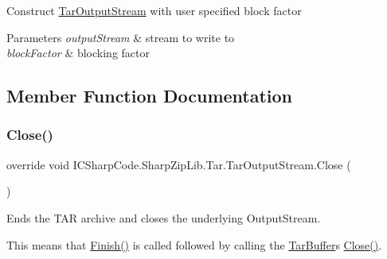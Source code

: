 Construct \hyperlink{class_i_c_sharp_code_1_1_sharp_zip_lib_1_1_tar_1_1_tar_output_stream}{Tar\+Output\+Stream} with user specified block factor 


\begin{DoxyParams}{Parameters}
{\em output\+Stream} & stream to write to\\
\hline
{\em block\+Factor} & blocking factor\\
\hline
\end{DoxyParams}


\subsection{Member Function Documentation}
\mbox{\label{class_i_c_sharp_code_1_1_sharp_zip_lib_1_1_tar_1_1_tar_output_stream_ab744534cafac308f51f6586f06ca3d86}} 
\subsubsection{\texorpdfstring{Close()}{Close()}}
{\footnotesize\ttfamily override void I\+C\+Sharp\+Code.\+Sharp\+Zip\+Lib.\+Tar.\+Tar\+Output\+Stream.\+Close (\begin{DoxyParamCaption}{ }\end{DoxyParamCaption})\hspace{0.3cm}{\ttfamily [inline]}}



Ends the T\+AR archive and closes the underlying Output\+Stream. 

This means that \hyperlink{class_i_c_sharp_code_1_1_sharp_zip_lib_1_1_tar_1_1_tar_output_stream_a35766aed4ddf363bbaca72d33b0e071d}{Finish()} is called followed by calling the \hyperlink{class_i_c_sharp_code_1_1_sharp_zip_lib_1_1_tar_1_1_tar_buffer}{Tar\+Buffer}\textquotesingle{}s \hyperlink{class_i_c_sharp_code_1_1_sharp_zip_lib_1_1_tar_1_1_tar_output_stream_ab744534cafac308f51f6586f06ca3d86}{Close()}.\mbox{\label{class_i_c_sharp_code_1_1_sharp_zip_lib_1_1_tar_1_1_tar_output_stream_a655ddc3a9e0219c85e900de5deb0cf74}} 
